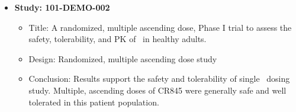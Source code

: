 \begin{itemize}
\item
\textbf{Study: 101-DEMO-002}
\begin{itemize}
\item
Title: A randomized, multiple ascending dose, Phase I trial to assess the safety, 
tolerability, and \gls{PK} of \drugx\ in healthy adults.

\item
Design: Randomized, multiple ascending dose study
\item
Conclusion: Results support the safety and tolerability of single \drugx\ dosing study.
Multiple, ascending doses of CR845 were generally safe and well tolerated in this patient population.

\end{itemize}
\end{itemize}
